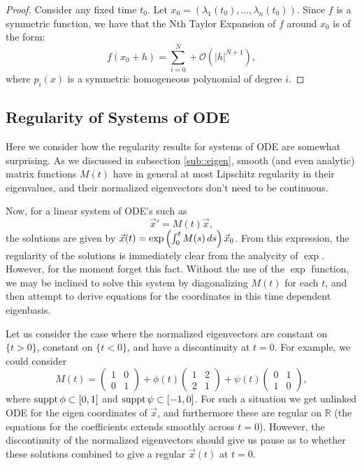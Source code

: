 \begin{proof}

Consider any fixed time $t_0$. Let $x_0 = (\lambda_1(t_0), ..., \lambda_n(t_0)).$ Since $f$ is a symmetric function, we have that the Nth Taylor Expansion of $f$ around $x_0$ is of the form:
\begin{equation}
f(x_0 + h) = \sum\limits_{i=0}^N + \mathcal O( |h|^{N+1}),
\end{equation}
where $p_i(x)$ is a symmetric homogeneous polynomial of degree $i$. 

\end{proof}


\subsection{Regularity of Systems of ODE}
 
 Here we consider how the regularity results for systems of ODE are somewhat surprising. As we discussed in subsection \ref{sub::eigen}, smooth (and even analytic) matrix functions \(M(t)\) have in general at most Lipschitz regularity in their eigenvalues, and their normalized eigenvectors don't need to be continuous.
 
 Now, for a linear system of ODE's such as 
 \begin{equation}
 \vec x' = M(t) \vec x,
 \end{equation}
 the solutions are given by \(\vec x(t) = \exp\left( \int_0^t M(s) \, ds \right) \vec x_0\). From this expression, the regularity of the solutions is immediately clear from the analycity of \(\exp\). However, for the moment forget this fact. Without the use of the \(\exp\) function, we may be inclined to solve this system by diagonalizing \(M(t)\) for each \(t\), and then attempt to derive equations for the coordinates in this time dependent eigenbasis.

Let us consider the case where the normalized eigenvectors are constant on \(\{t>0\}\), constant on \(\{t<0\}\), and have a discontinuity at \(t=0\). For example, we could consider
 \begin{equation}
 M(t) = \begin{pmatrix}1 & 0\\0 & 1 \end{pmatrix} + \phi(t) \begin{pmatrix}1 & 2 \\ 2 & 1 \end{pmatrix} + \psi(t) \begin{pmatrix} 0 & 1\\ 1 & 0 \end{pmatrix},
 \end{equation}
where \( \operatorname{suppt} \phi \subset [0,1]\) and \(\operatorname{suppt} \psi \subset [-1,0]\). For such a situation we get unlinked ODE for the eigen coordinates of \(\vec x\), and furthermore these are regular on \(\mathbb R\) (the equations for the coefficients extends smoothly across \(t=0\)). However, the discontinuity of the normalized eigenvectors should give us pause as to whether these solutions combined to give a regular \(\vec x(t)\) at \(t=0\).

